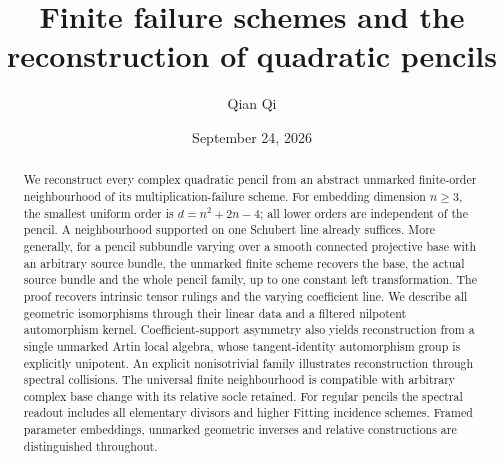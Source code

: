 \title[Finite failure schemes and quadratic pencils]{Finite failure schemes and the reconstruction of quadratic pencils}
\author{Qian Qi}
\date{September 24, 2026}
\begin{abstract}
We reconstruct every complex quadratic pencil from an abstract unmarked
finite-order neighbourhood of its multiplication-failure scheme.  For
embedding dimension \(n\ge3\), the smallest uniform order is
\(d=n^2+2n-4\); all lower orders are independent of the pencil.  A
neighbourhood supported on one Schubert line already suffices.  More
generally, for a pencil subbundle varying over a smooth connected
projective base with an arbitrary source bundle, the unmarked
finite scheme recovers the base, the actual source bundle and the whole
pencil family, up to one constant left transformation.  The proof
recovers intrinsic tensor rulings and the varying coefficient line.
We describe all geometric isomorphisms through their linear data and a
filtered nilpotent automorphism kernel.  Coefficient-support asymmetry
also yields reconstruction from a single unmarked Artin local algebra,
whose tangent-identity automorphism group is explicitly unipotent.  An explicit nonisotrivial
family illustrates reconstruction through spectral collisions.  The
universal finite neighbourhood is compatible with arbitrary complex
base change with its relative socle retained.  For regular pencils the
spectral readout includes all elementary divisors and higher Fitting
incidence schemes.  Framed parameter embeddings, unmarked geometric
inverses and relative constructions are distinguished throughout.
\end{abstract}
\maketitle
